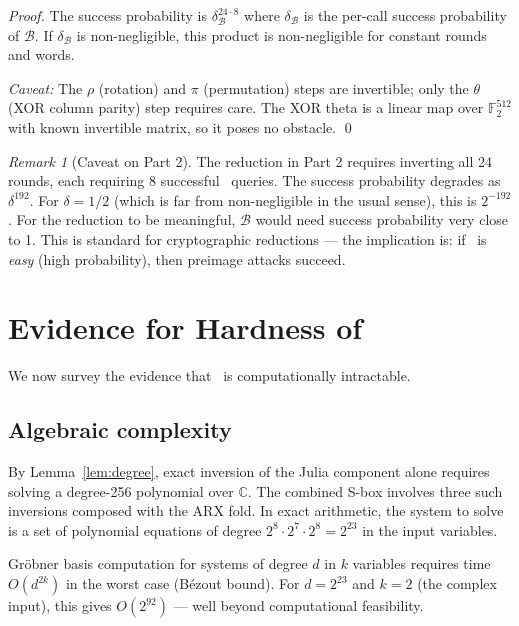 \documentclass[11pt]{article}
\theoremstyle{definition}
\theoremstyle{remark}
\newtheorem{remark}[theorem]{Remark}
\newcommand{\FIP}{\mathsf{FIP}}       %
\begin{document}
\begin{proof}
The success probability is $\delta_{\mathcal{B}}^{24 \cdot 8}$ where
$\delta_{\mathcal{B}}$ is the per-call success probability of $\mathcal{B}$.
If $\delta_{\mathcal{B}}$ is non-negligible, this product is non-negligible
for constant rounds and words.

\textit{Caveat:} The $\rho$ (rotation) and $\pi$ (permutation) steps are
invertible; only the $\theta$ (XOR column parity) step requires care.
The XOR theta is a linear map over $\mathbb{F}_2^{512}$ with known
invertible matrix, so it poses no obstacle.
\qed
\end{proof}

\begin{remark}[Caveat on Part 2]
The reduction in Part 2 requires inverting all 24 rounds, each requiring 8
successful \FIP\ queries. The success probability degrades as
$\delta^{192}$. For $\delta = 1/2$ (which is far from non-negligible in the
usual sense), this is $2^{-192}$. For the reduction to be meaningful,
$\mathcal{B}$ would need success probability very close to 1. This is standard
for cryptographic reductions --- the implication is: if \FIP\ is
\emph{easy} (high probability), then preimage attacks succeed.
\end{remark}

\section{Evidence for Hardness of \FIP}
\label{sec:fip-hardness}

We now survey the evidence that \FIP\ is computationally intractable.

\subsection{Algebraic complexity}

By Lemma~\ref{lem:degree}, exact inversion of the Julia component alone
requires solving a degree-256 polynomial over $\mathbb{C}$. The combined
S-box involves three such inversions composed with the ARX fold. In exact
arithmetic, the system to solve is a set of polynomial equations of degree
$2^8 \cdot 2^7 \cdot 2^8 = 2^{23}$ in the input variables.

Gr\"obner basis computation for systems of degree $d$ in $k$ variables
requires time $O(d^{2k})$ in the worst case (Bézout bound). For $d = 2^{23}$
and $k = 2$ (the complex input), this gives $O(2^{92})$ --- well beyond
computational feasibility.
\end{document}
